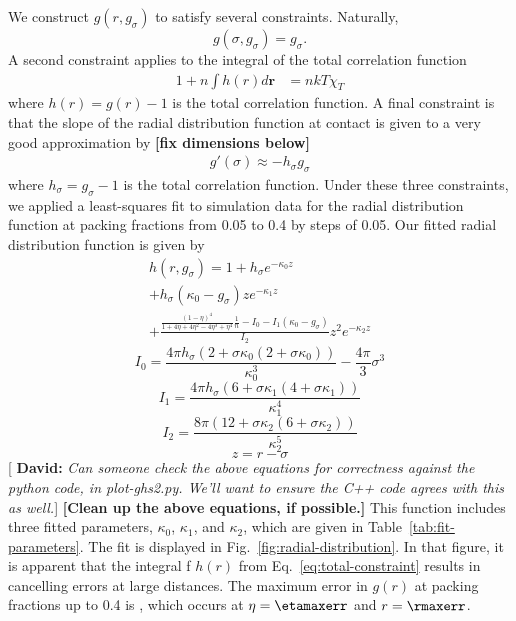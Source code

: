 \documentclass[letterpaper,twocolumn,amsmath,amssymb,pre,aps,10pt]{revtex4-1}
\newcommand{\red}[1]{{\bf \color{red} #1}}
\newcommand{\green}[1]{{\bf \color{green} #1}}
\newcommand{\rr}{\textbf{r}}
\newcommand{\fixme}[1]{\red{[#1]}}
\newcommand{\davidsays}[1]{{\color{red} [\green{David:} \emph{#1}]}}
\begin{document}
We construct $g(r, g_\sigma)$ to satisfy several constraints.  Naturally,
\begin{equation}
  g(\sigma, g_\sigma) = g_\sigma.
\end{equation}
A second constraint applies to the integral of the total correlation
function
\begin{align}
  1 + n\int h(r)d\rr &= nkT\chi_T \label{eq:total-constraint}
\end{align}
where $h(r) = g(r) - 1$ is the total correlation function.
A final constraint is that the slope of the radial distribution
function at contact is given to a very good approximation by \fixme{fix dimensions below}
\begin{align}
  g'(\sigma) \approx - h_\sigma g_\sigma
\end{align}
where $h_\sigma = g_\sigma - 1$ is the total correlation function.
Under these three constraints, we applied a least-squares fit to
simulation data for the radial distribution function at packing
fractions from 0.05 to 0.4 by steps of 0.05.  Our fitted radial
distribution function is given by
\newcommand\kappaa{\kappa_0}
\newcommand\kappab{\kappa_1}
\newcommand\kappac{\kappa_2}
\begin{multline}
  h(r,g_\sigma) = 1 + h_\sigma e^{-\kappaa z} \\
  + h_\sigma(\kappaa - g_\sigma) ze^{-\kappab z} \\
  + \frac{\frac{(1-\eta)^4}{1+4\eta + 4\eta^2 - 4\eta^3 +
      \eta^4}\frac{1}{n}
    - I_0  -I_1(\kappaa - g_\sigma)}{I_2} z^2e^{-\kappac z}
\end{multline}
\begin{equation}
  I_0 = \frac{4\pi h_\sigma (2 + \sigma \kappaa (2 + \sigma \kappaa))}{\kappaa^3}
  - \frac{4\pi}{3} \sigma^3
\end{equation}
\begin{equation}
  I_1 = \frac{4\pi h_\sigma (6 + \sigma \kappab (4 + \sigma \kappab))}{\kappab^4}
\end{equation}
\begin{equation}
  I_2 = \frac{8\pi (12 + \sigma \kappac (6 + \sigma \kappac))}{\kappac^5}
\end{equation}
\begin{equation}
  z = r - \sigma
\end{equation}
\davidsays{Can someone check the above equations for correctness
  against the python code, in plot-ghs2.py.  We'll want to
  ensure the C++ code agrees with this as well.}
\fixme{Clean up the above equations, if possible.}
This function includes three fitted parameters, $\kappaa$, $\kappab$,
and $\kappac$, which are given in Table~\ref{tab:fit-parameters}.
The fit is displayed in Fig.~\ref{fig:radial-distribution}.  In that
figure, it is apparent that the integral f $h(r)$ from
Eq.~\ref{eq:total-constraint} results in cancelling errors at large
distances.  The maximum error in $g(r)$ at packing fractions up to
0.4 is \maxerr, which occurs at $\eta = \etamaxerr$ and $r =
\rmaxerr$.
\end{document}
